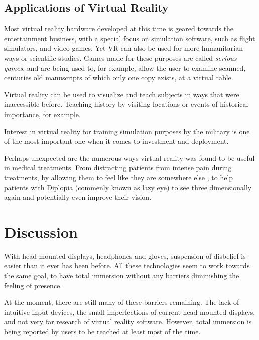 \documentclass[11pt]{article}
\begin{document}
	\subsection{Applications of Virtual Reality}
	Most virtual reality hardware developed at this time is geared towards the entertainment business, with a special focus on simulation software, such as flight simulators, and video games. %
	Yet VR can also be used for more humanitarian ways or scientific studies. Games made for these purposes are called \emph{serious games}, and are being used to, for example, allow the user to examine scanned, centuries old manuscripts of which only one copy exists, at a virtual table. \cite{lorenzini2013serious}
	
	Virtual reality can be used to visualize and teach subjects in ways that were inaccessible before. Teaching history by visiting locations or events of historical importance, for example. \cite{mosaker2001visualising}
	
	Interest in virtual reality for training simulation purposes by the military is one of the most important one when it comes to investment and deployment. \cite{moshell1993three}
	
	Perhaps unexpected are the numerous ways virtual reality was found to be useful in medical treatments. From distracting patients from intense pain during treatments, by allowing them to feel like they are somewhere else \cite{hoffman14}, %
	to help patients with Diplopia (commenly known as lazy eye) to see three dimensionally again and potentially even improve their vision. \cite{blaha2014diplopia}

\section{Discussion}
With head-mounted displays, headphones and gloves, suspension of disbelief is easier than it ever has been before. All these technologies seem to work towards the same goal, to have total immersion without any barriers diminishing the feeling of presence.

At the moment, there are still many of these barriers remaining. The lack of intuitive input devices, the small imperfections of current head-mounted displays, and not very far research of virtual reality software. However, total immersion is being reported by users to be reached at least most of the time. \cite{bastiaens14}
\end{document}
